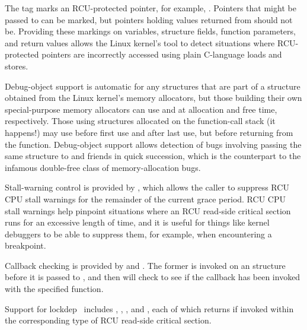 The  tag marks an RCU-protected pointer, for example,
.
Pointers that might be passed to  can be marked,
but pointers holding values returned from 
should not be.
Providing these markings on variables, structure fields, function
parameters, and return values allows the Linux kernel's 
tool to detect situations where RCU-protected pointers are
incorrectly accessed using plain C-language loads and stores.

Debug-object support is automatic for any  structures
that are part of a structure obtained from the Linux kernel's
memory allocators, but those building their own special-purpose
memory allocators can use  and 
at allocation and free time, respectively.
Those using  structures allocated on the function-call
stack (it happens!\@) may use 
before first use and  after last use,
but before returning from the function.
Debug-object support allows detection of bugs involving passing the
same  structure to  and friends in
quick succession, which is the  counterpart to the
infamous double-free class of memory-allocation bugs.

Stall-warning control is provided by , which
allows the caller to suppress RCU CPU stall warnings for the remainder
of the current grace period.
RCU CPU stall warnings help pinpoint situations where an RCU read-side
critical section runs for an excessive length of time, and it is useful
for things like kernel debuggers to be able to suppress them, for example,
when encountering a breakpoint.

Callback checking is provided by  and
.
The former is invoked on an  structure before it is passed
to , and then  will
check to see if the callback has been invoked with the specified
function.

Support for lockdep~\cite{JonathanCorbet2006lockdep} includes
,
,
, and
,
each of which returns  if invoked within the corresponding
type of RCU read-side critical section.

\QuickQuizEnd

